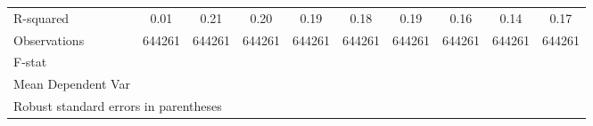 {\begin{tabular}{l*{9}{c}}
\hline
R-squared           &        0.01         &        0.21         &        0.20         &        0.19         &        0.18         &        0.19         &        0.16         &        0.14         &        0.17         \\
Observations        &      644261         &      644261         &      644261         &      644261         &      644261         &      644261         &      644261         &      644261         &      644261         \\
F-stat              &                     &                     &                     &                     &                     &                     &                     &                     &                     \\
Mean Dependent Var  &                     &                     &                     &                     &                     &                     &                     &                     &                     \\
\hline\hline
\multicolumn{10}{l}{\footnotesize Robust standard errors in parentheses}\\
\end{tabular}
}
